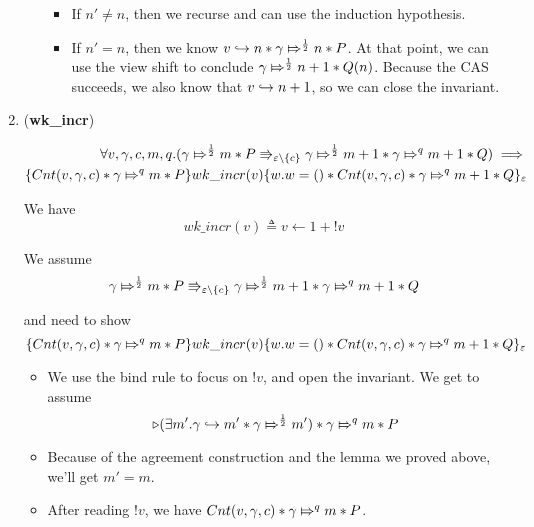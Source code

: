 \begin{enumerate}
\begin{itemize}
\begin{itemize}
\item If $n' \ne n$, then we recurse and can use the induction hypothesis.

\item If $n' = n$, then we know $\pointsto{v}{n} * \apointsto{\gamma}{n}{\frac{1}{2}} * P$.
At that point, we can use the view shift to conclude $\apointsto{\gamma}{n + 1}{\frac{1}{2}} * Q(n)$.  Because the CAS succeeds, we also know that $\pointsto{v}{n + 1}$, so we can close the invariant.

\end{itemize}

\end{itemize}

\item (\textbf{wk\_incr})

\begin{align*}
\forall v, \gamma, c, m, q.  (\apointsto{\gamma}{m}{\frac{1}{2}} * P \Rrightarrow_{\varepsilon \backslash \{ c \}} \apointsto{\gamma}{m + 1}{\frac{1}{2}} * \apointsto{\gamma}{m + 1}{q} * Q) \implies \\
\hot{\Cnt{v}{\gamma}{c} * \apointsto{\gamma}{m}{q}  * P}{wk\_incr(v)}{w. w = () * \Cnt{v}{\gamma}{c} * \apointsto{\gamma}{m + 1}{q} * Q}_{\varepsilon}
\end{align*}

We have 
\[
wk\_incr(v) \triangleq v \gets 1 + !v
\]

We assume 
\[
\apointsto{\gamma}{m}{\frac{1}{2}} * P \Rrightarrow_{\varepsilon \backslash \{ c \}} \apointsto{\gamma}{m + 1}{\frac{1}{2}} * \apointsto{\gamma}{m + 1}{q} * Q
\]

and need to show
\[
\hot{\Cnt{v}{\gamma}{c} * \apointsto{\gamma}{m}{q}  * P}{wk\_incr(v)}{w. w = () * \Cnt{v}{\gamma}{c} * \apointsto{\gamma}{m + 1}{q} * Q}_{\varepsilon}
\]

\begin{itemize}

\item We use the bind rule to focus on $!v$, and open the invariant. We get to assume
\[
\latermod{(\exists m'. \pointsto{\gamma}{m'} * \apointsto{\gamma}{m'}{\frac{1}{2}})} * \apointsto{\gamma}{m}{q} * P
\]

\item Because of the agreement construction and the lemma we proved above, we'll get $m' = m$.

\item After reading $!v$, we have $\Cnt{v}{\gamma}{c} * \apointsto{\gamma}{m}{q} * P$.


\end{itemize}
\end{enumerate}
